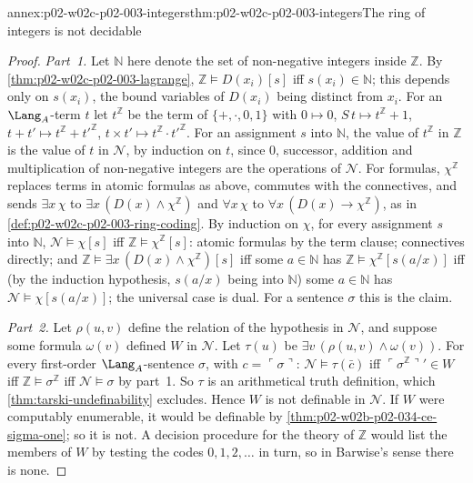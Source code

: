 \begin{annexitem}{annex:p02-w02c-p02-003-integers}{thm:p02-w02c-p02-003-integers}{The ring of integers is not decidable}
\begin{proof}
\emph{Part~1.}  Let \(\mathbb N\) here denote the set of non-negative
integers inside \(\mathbb Z\).  By \cref{thm:p02-w02c-p02-003-lagrange},
\(\mathbb Z\models D(x_i)[s]\) iff \(s(x_i)\in\mathbb N\); this depends
only on \(s(x_i)\), the bound variables of \(D(x_i)\) being distinct from
\(x_i\).  For an
\(\Lang_A\)-term \(t\) let \(t^{\mathbb Z}\) be the term of
\(\{+,\cdot,0,1\}\) with \(0\mapsto0\), \(S\,t\mapsto t^{\mathbb Z}+1\),
\(t+t'\mapsto t^{\mathbb Z}+t'^{\mathbb Z}\),
\(t\times t'\mapsto t^{\mathbb Z}\cdot t'^{\mathbb Z}\).  For an assignment
\(s\) into \(\mathbb N\), the value of \(t^{\mathbb Z}\) in \(\mathbb Z\) is
the value of \(t\) in \(\mathcal N\), by induction on \(t\), since \(0\),
successor, addition and multiplication of non-negative integers are the
operations of \(\mathcal N\).  For formulas, \(\chi^{\mathbb Z}\) replaces
terms in atomic formulas as above, commutes with the connectives, and sends
\(\exists x\,\chi\) to \(\exists x\,(D(x)\land\chi^{\mathbb Z})\) and
\(\forall x\,\chi\) to \(\forall x\,(D(x)\to\chi^{\mathbb Z})\), as in
\cref{def:p02-w02c-p02-003-ring-coding}.  By induction on
\(\chi\), for every assignment \(s\) into \(\mathbb N\),
\(\mathcal N\models\chi[s]\) iff \(\mathbb Z\models\chi^{\mathbb Z}[s]\):
atomic formulas by the term clause; connectives directly; and
\(\mathbb Z\models\exists x\,(D(x)\land\chi^{\mathbb Z})[s]\) iff some
\(a\in\mathbb N\) has \(\mathbb Z\models\chi^{\mathbb Z}[s(a/x)]\) iff (by
the induction hypothesis, \(s(a/x)\) being into \(\mathbb N\)) some
\(a\in\mathbb N\) has \(\mathcal N\models\chi[s(a/x)]\); the universal case
is dual.  For a sentence \(\sigma\) this is the claim.

\emph{Part~2.}  Let \(\rho(u,v)\) define the relation of the hypothesis in
\(\mathcal N\), and suppose some formula \(\omega(v)\) defined \(W\) in
\(\mathcal N\).  Let \(\tau(u)\) be \(\exists v\,(\rho(u,v)\land\omega(v))\).
For every first-order \(\Lang_A\)-sentence \(\sigma\), with
\(c=\ulcorner\sigma\urcorner\):
\(\mathcal N\models\tau(\bar c)\) iff \(\ulcorner\sigma^{\mathbb Z}\urcorner'\in W\)
iff \(\mathbb Z\models\sigma^{\mathbb Z}\) iff \(\mathcal N\models\sigma\)
by part~1.  So \(\tau\) is an arithmetical truth definition, which
\cref{thm:tarski-undefinability} excludes.  Hence \(W\) is not definable
in \(\mathcal N\).  If \(W\) were computably enumerable, it would be
definable by \cref{thm:p02-w02b-p02-034-ce-sigma-one}; so it is not.  A
decision procedure for the theory of \(\mathbb Z\) would list the members
of \(W\) by testing the codes \(0,1,2,\ldots\) in turn, so in Barwise's
sense there is none.


\end{proof}
\end{annexitem}
